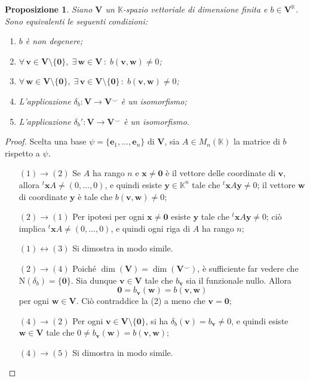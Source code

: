 \documentclass{article}
\theoremstyle{plain}
\newtheorem{prop}[thm]{Proposizione}
\theoremstyle{definition}
\theoremstyle{remark}
\begin{document}
\vspace{10pt}

\begin{bxthm}
\begin{prop}\label{quindicisei}
Siano $\mathbf{V}$ un $\mathbb{K}$-spazio vettoriale di dimensione finita e $b\in\mathbf{V}^\mathbb{K}$.
Sono equivalenti le seguenti condizioni:
\begin{enumerate}
\item $b$ è non degenere;
\item $\forall\,\mathbf{v}\in\mathbf{V}\setminus\{\mathbf{0}\},\;\exists\,\mathbf{w} \in \mathbf{V}\,:\;b(\mathbf{v}, \mathbf{w}) \neq 0$;
\item $\forall\,\mathbf{w}\in\mathbf{V}\setminus\{\mathbf{0}\},\;\exists\,\mathbf{v} \in \mathbf{V}\setminus\{\mathbf{0}\}\,:\;b(\mathbf{v}, \mathbf{w}) \neq 0$;
\item L'applicazione $\delta_b : \mathbf{V} \to \mathbf{V}^\smallsmile$ è un isomorfismo;
\item L'applicazione $\delta_b': \mathbf{V} \to \mathbf{V}^\smallsmile$ è un isomorfismo.
\end{enumerate}    
\end{prop}
\end{bxthm}
\begin{proof}
Scelta una base $\psi = \{\mathbf{e}_1, \ldots, \mathbf{e}_n\}$ di $\mathbf{V}$, sia $A \in M_n(\mathbb{K})$ 
la matrice di $b$ rispetto a $\psi$.
\begin{itemize}
    \item[$(1)\to(2)$] Se $A$ ha rango $n$ e $\mathbf{x}\neq\mathbf{0}$ è il vettore delle coordinate di $\mathbf{v}$, allora ${}^t\mathbf{x}A \neq (0, \ldots, 0)$, e quindi esiste $\mathbf{y} \in \mathbb{K}^n$ tale che ${}^t\mathbf{x} A \mathbf{y} \neq 0$; il vettore $\mathbf{w}$ di coordinate $\mathbf{y}$ è tale che $b(\mathbf{v}, \mathbf{w}) \neq 0$;
    \item[$(2)\to(1)$] Per ipotesi per ogni $\mathbf{x} \neq \mathbf{0}$ esiste $\mathbf{y}$ tale che ${}^t\mathbf{x} A \mathbf{y} \neq 0$; ciò implica ${}^t\mathbf{x} A \neq (0, \ldots, 0)$, e quindi ogni riga di $A$ ha rango $n$;
    \item[$(1)\leftrightarrow(3)$] Si dimostra in modo simile.
    \item[$(2)\to(4)$] Poiché $\dim(\mathbf{V}) = \dim(\mathbf{V}^\smallsmile)$, è sufficiente far vedere che $\mathrm{N}(\delta_b) = \{\mathbf{0}\}$. Sia dunque $\mathbf{v} \in \mathbf{V}$ tale che $b_\mathbf{v}$ sia il funzionale nullo. 
    Allora
    \[\mathbf{0} = b_\mathbf{v}(\mathbf{w}) = b(\mathbf{v}, \mathbf{w})\]
    per ogni $\mathbf{w} \in \mathbf{V}$. Ciò contraddice la (2) a meno che $\mathbf{v} = \mathbf{0}$;
    \item[$(4)\to(2)$]  Per ogni $\mathbf{v} \in \mathbf{V}\setminus\{\mathbf{0}\}$, si ha $\delta_b(\mathbf{v}) =b_\mathbf{v}\neq \mathit{0}$, 
    e quindi esiste $\mathbf{w} \in \mathbf{V}$ tale che $0 \neq b_\mathbf{v}(\mathbf{w}) = b(\mathbf{v}, \mathbf{w})$;
    \item[$(4)\to(5)$]  Si dimostra in modo simile.
\end{itemize}    
\end{proof}
\end{document}
